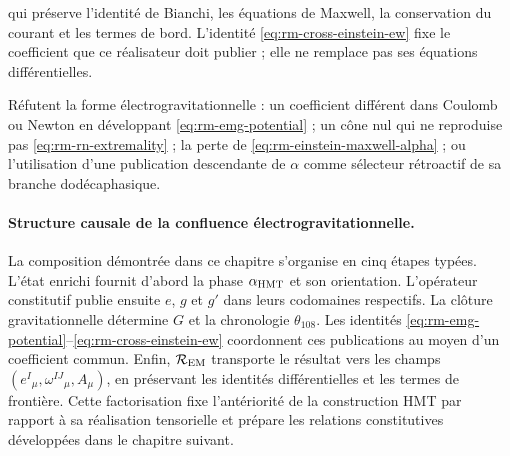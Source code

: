 qui préserve l'identité de Bianchi, les équations de Maxwell, la
conservation du courant et les termes de bord. L'identité
\eqref{eq:rm-cross-einstein-ew} fixe le coefficient que ce réalisateur doit
publier ; elle ne remplace pas ses équations différentielles.

\begin{falsifierbox}
Réfutent la forme électrogravitationnelle : un coefficient différent dans Coulomb ou
Newton en développant \eqref{eq:rm-emg-potential} ; un cône nul qui ne reproduise pas
\eqref{eq:rm-rn-extremality} ; la perte de
\eqref{eq:rm-einstein-maxwell-alpha} ; ou l'utilisation d'une publication
descendante de \(\alpha\) comme sélecteur rétroactif de sa branche dodécaphasique.
\end{falsifierbox}

\paragraph{Structure causale de la confluence électrogravitationnelle.}
La composition démontrée dans ce chapitre s'organise en cinq étapes
typées. L'état enrichi fournit d'abord la phase
\(\alpha_{\rm HMT}\) et son orientation. L'opérateur constitutif publie ensuite
\(e\), \(g\) et \(g'\) dans leurs codomaines respectifs. La clôture gravitationnelle
détermine \(G\) et la chronologie \(\theta_{108}\). Les identités
\eqref{eq:rm-emg-potential}--\eqref{eq:rm-cross-einstein-ew} coordonnent ces
publications au moyen d'un coefficient commun. Enfin,
\(\mathcal R_{\rm EM}\) transporte le résultat vers les champs
\((e^I{}_{\mu},\omega^{IJ}{}_{\mu},A_\mu)\), en préservant les identités
différentielles et les termes de frontière. Cette factorisation fixe
l'antériorité de la construction HMT par rapport à sa réalisation tensorielle et
prépare les relations constitutives développées dans le chapitre suivant.
